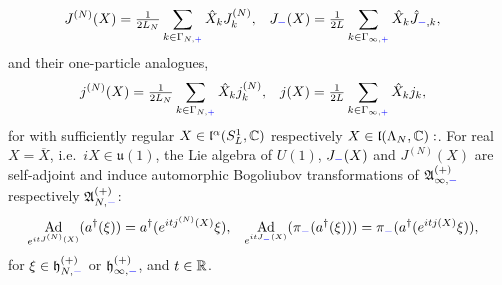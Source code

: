 \documentclass[a4paper, 11pt]{article}
\newcommand{\fA}{\mathfrak{A}}\newcommand{\cA}{\mathcal{A}}\newcommand{\dA}{\mathds{A}}\newcommand{\sA}{\mathscr{A}}
\newcommand{\fh}{\mathfrak{h}}
\newcommand{\fl}{\mathfrak{l}}\newcommand{\cl}{\mathcal{l}}
\newcommand{\fu}{\mathfrak{u}}
\DeclareMathOperator{\Ad}{Ad}
\DeclareMathOperator{\1}{\mathds{1}}
\begin{document}
\begin{align}
\label{eq:U1cursmeared}
J^{(N)}(X) & = \tfrac{1}{2L_{N}}\sum_{k\in\Gamma_{N,{\color{blue}+}}}\hat{X}_{k}J^{(N)}_{k}, & J_{{\color{blue}-}}(X) & = \tfrac{1}{2L}\sum_{k\in\Gamma_{\infty,{\color{blue}+}}}\hat{X}_{k}\hat{J}_{{\color{blue}-},k},
\end{align}
and their one-particle analogues,
\begin{align}
\label{eq:U1cur1psmeared}
j^{(N)}(X) & = \tfrac{1}{2L_{N}}\sum_{k\in\Gamma_{N,{\color{blue}+}}}\hat{X}_{k}j^{(N)}_{k}, & j(X) & = \tfrac{1}{2L}\sum_{k\in\Gamma_{\infty,{\color{blue}+}}}\hat{X}_{k}j_{k},
\end{align}
for with sufficiently regular $X\in\fl^{\alpha}(S^{1}_{L},\C)$ respectively $X\in\fl(\Lambda_{N},\C):$. For real $X = \overline{X}$, i.e.~$iX\in\fu(1)$, the Lie algebra of $U(1)$, $J_{{\color{blue}-}}(X)$ and $J^{(N)}(X)$ are self-adjoint and induce automorphic Bogoliubov transformations of $\fA^{(+)}_{\infty,{\color{blue}-}}$ respectively $\fA^{(+)}_{N,{\color{blue}-}}$:
\begin{align}
\label{eq:U1curBT}
\Ad_{e^{itJ^{(N)}(X)}}(a^{\dagger}(\xi)) & = a^{\dagger}(e^{itj^{(N)}(X)}\xi), & \Ad_{e^{itJ_{{\color{blue}-}}(X)}}(\pi_{{\color{blue}-}}(a^{\dagger}(\xi))) & = \pi_{{\color{blue}-}}(a^{\dagger}(e^{itj(X)}\xi)), 
\end{align}
for $\xi\in\fh^{(+)}_{N,{\color{blue}-}}$ or $\fh^{(+)}_{\infty,{\color{blue}-}}$, and $t\in\mathbb{R}$.

\bigskip
\end{document}
